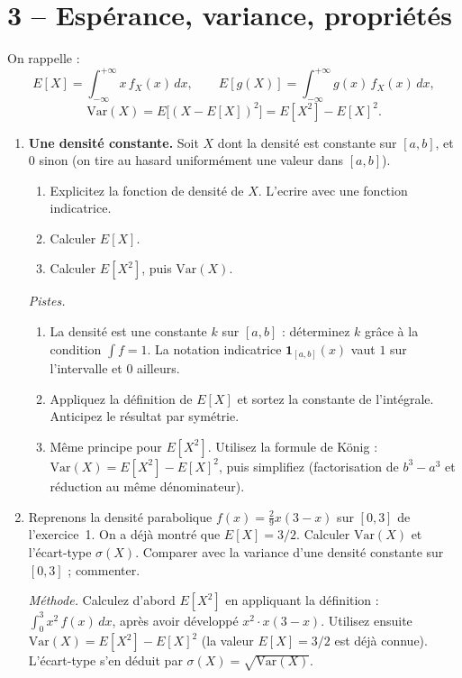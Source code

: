 \section*{3 -- Espérance, variance, propriétés}

On rappelle :
\[
  E[X]=\int_{-\infty}^{+\infty}\!x\,f_X(x)\,dx,\qquad
  E[g(X)]=\int_{-\infty}^{+\infty}\!g(x)\,f_X(x)\,dx,
\]
\[
  \text{Var}(X)=E\bigl[(X-E[X])^2\bigr]=E[X^2]-E[X]^2.
\]

\begin{enumerate}
  \item \textbf{Une densité constante.}
  Soit $X$ dont la densité est constante
  sur $[a,b]$, et $0$ sinon (on \og tire au hasard uniformément \fg{}
  une valeur dans $[a,b]$).
  \begin{enumerate}
    \item Explicitez la fonction de densité de $X$. L'ecrire avec une fonction indicatrice. 
    \item Calculer $E[X]$.
    \item Calculer $E[X^2]$, puis $\text{Var}(X)$.
  \end{enumerate}
  \begin{solution}
    \textit{Pistes.}
    \begin{enumerate}
    \item La densité est une constante $k$ sur $[a,b]$ :
    déterminez $k$ grâce à la condition $\int f=1$. La notation
    indicatrice $\mathbf{1}_{[a,b]}(x)$ vaut $1$ sur l'intervalle
    et $0$ ailleurs.
    \item Appliquez la définition de $E[X]$ et sortez la constante
    de l'intégrale. Anticipez le résultat par symétrie.
    \item Même principe pour $E[X^2]$. Utilisez la formule de
    König : $\text{Var}(X)=E[X^2]-E[X]^2$, puis simplifiez
    (factorisation de $b^3-a^3$ et réduction au même dénominateur).
    \end{enumerate}
  \end{solution}

  \item Reprenons la densité parabolique $f(x)=\tfrac{2}{9}x(3-x)$
  sur $[0,3]$ de l'exercice~1. On a déjà montré que $E[X]=3/2$.
  Calculer $\text{Var}(X)$ et l'écart-type $\sigma(X)$.
  Comparer avec la variance d'une densité constante sur $[0,3]$ ;
  commenter.
  \begin{solution}
    \textit{Méthode.} Calculez d'abord $E[X^2]$ en appliquant la
    définition : $\int_0^3 x^2\,f(x)\,dx$, après avoir développé
    $x^2\cdot x(3-x)$. Utilisez ensuite $\text{Var}(X)=E[X^2]-E[X]^2$
    (la valeur $E[X]=3/2$ est déjà connue). L'écart-type s'en
    déduit par $\sigma(X)=\sqrt{\text{Var}(X)}$.


\end{solution}
\end{enumerate}
